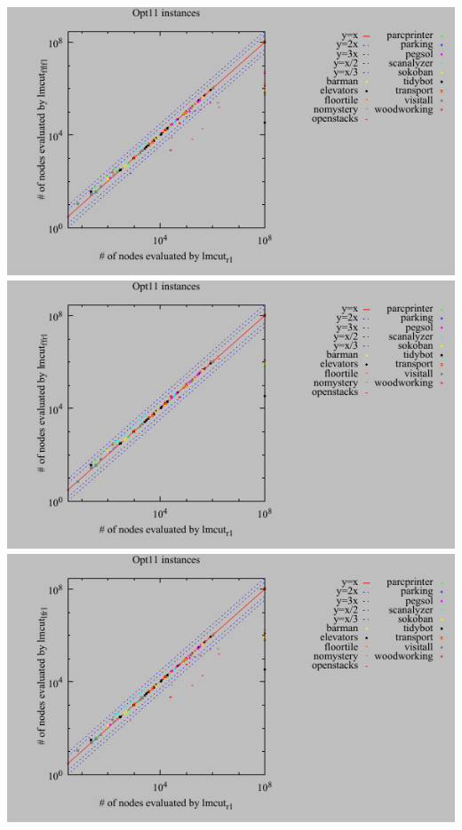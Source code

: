 \includegraphics{tables/opt11-evaluated-lmcut_r-lmcut_fflf.pdf}
\linebreak
\includegraphics{tables/opt11-evaluated-lmcut_r-lmcut_ffr.pdf}
\linebreak
\includegraphics{tables/opt11-evaluated-lmcut_r-lmcut_lfr.pdf}
\linebreak
